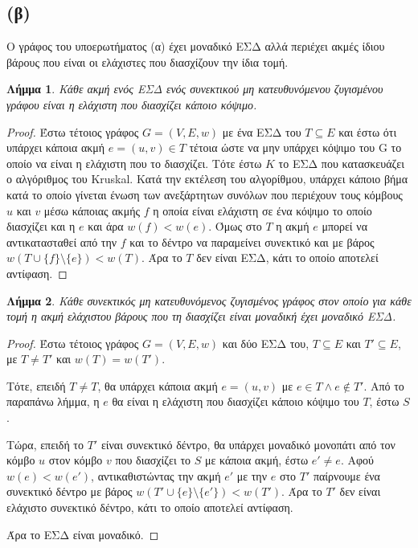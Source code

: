 \documentclass[11pt,a4paper]{book}
\newtheorem*{lemma}{Λήμμα}
\begin{document}
\subsection*{(β)}
Ο γράφος του υποερωτήματος (α) έχει μοναδικό ΕΣΔ αλλά περιέχει ακμές ίδιου βάρους που είναι οι ελάχιστες που διασχίζουν την ίδια τομή.

\begin{lemma}
Κάθε ακμή ενός ΕΣΔ ενός συνεκτικού μη κατευθυνόμενου ζυγισμένου γράφου είναι η ελάχιστη που διασχίζει κάποιο κόψιμο.
\end{lemma}
\begin{proof}
Έστω τέτοιος γράφος $G = (V, E, w)$ με ένα ΕΣΔ του $T \subseteq E$ και έστω ότι υπάρχει κάποια ακμή $e = (u, v) \in T$ τέτοια ώστε να μην υπάρχει κόψιμο του G το οποίο να είναι η ελάχιστη που το διασχίζει. Τότε έστω $K$ το ΕΣΔ που κατασκευάζει ο αλγόριθμος του \textlatin{Kruskal}. Κατά την εκτέλεση του αλγορίθμου, υπάρχει κάποιο βήμα κατά το οποίο γίνεται ένωση των ανεξάρτητων συνόλων που περιέχουν τους κόμβους $u$ και $v$ μέσω κάποιας ακμής $f$ η οποία είναι ελάχιστη σε ένα κόψιμο το οποίο διασχίζει και η $e$ και άρα $w(f) < w(e)$. Όμως στο $T$ η ακμή $e$ μπορεί να αντικατασταθεί από την $f$ και το δέντρο να παραμείνει συνεκτικό και με βάρος $w( T \cup \{f\} \setminus \{e\}) < w( T )$. Άρα το $T$ δεν είναι ΕΣΔ, κάτι το οποίο αποτελεί αντίφαση.
\end{proof}

\begin{lemma}
Κάθε συνεκτικός μη κατευθυνόμενος ζυγισμένος γράφος στον οποίο για κάθε τομή η ακμή ελάχιστου βάρους που τη διασχίζει είναι μοναδική έχει μοναδικό ΕΣΔ.
\end{lemma}
\begin{proof}
Έστω τέτοιος γράφος $G = (V, E, w)$ και δύο ΕΣΔ του, $T \subseteq E$ και $T' \subseteq E$,
με $T \neq T'$ και $w(T) = w(T')$.

Τότε, επειδή $T \neq T$, θα υπάρχει κάποια ακμή $e = (u, v)$ με $e \in T \land e \not\in T'$. Από το παραπάνω λήμμα, η $e$ θα είναι η ελάχιστη που διασχίζει κάποιο κόψιμο του $T$, έστω $S$.

Τώρα, επειδή το $T'$ είναι συνεκτικό δέντρο, θα υπάρχει μοναδικό μονοπάτι από τον κόμβο $u$ στον κόμβο $v$ που διασχίζει το $S$ με κάποια ακμή, έστω $e' \neq e$. Αφού $w(e) < w(e')$, αντικαθιστώντας την ακμή $e'$ με την $e$ στο $T'$ παίρνουμε ένα συνεκτικό δέντρο με βάρος $w(T' \cup\{e\} \setminus \{e'\}) < w(T')$. Άρα το $T'$ δεν είναι ελάχιστο συνεκτικό δέντρο, κάτι το οποίο αποτελεί αντίφαση.

Άρα το ΕΣΔ είναι μοναδικό.
\end{proof}
\end{document}
